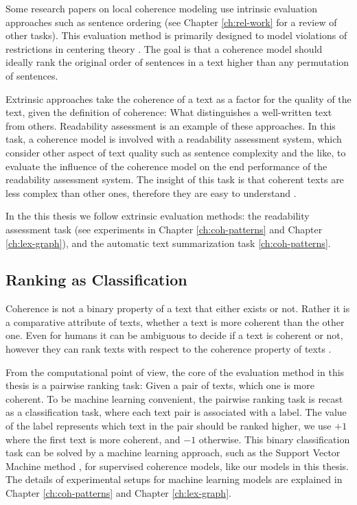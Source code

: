 Some research papers on local coherence modeling use intrinsic evaluation approaches such as sentence ordering \cite{karamanis04a,barzilay04} (see Chapter \ref{ch:rel-work} for a review of other tasks).  
This evaluation method is primarily designed to model violations of restrictions in centering theory . 
The goal is that a coherence model should ideally rank the original order of sentences in a text higher than any permutation of sentences. 

Extrinsic approaches take the coherence of a text as a factor for the quality of the text, given the definition of coherence: What distinguishes a well-written text from others. 
Readability assessment \cite{pitler08} is an example of these approaches. 
In this task, a coherence model is involved with a readability assessment system, which consider other aspect of text quality such as sentence complexity and the like, to evaluate the influence of the coherence model on the end performance of the readability assessment system. 
The insight of this task is that coherent texts are less complex than other ones, therefore they are easy to understand \cite{pitler08}. 

In the this thesis we follow extrinsic evaluation methods: the readability assessment task (see experiments in Chapter \ref{ch:coh-patterns} and Chapter \ref{ch:lex-graph}), and the automatic text summarization task \ref{ch:coh-patterns}. 

\subsection{Ranking as Classification} 

Coherence is not a binary property of a text that either exists or not. 
Rather it is a comparative attribute of texts, whether a text is more coherent than the other one. 
Even for humans it can be ambiguous to decide if a text is coherent or not, however they can rank texts with respect to the coherence property of texts \cite{halliday76}.   

From the computational point of view, the core of the evaluation method in this thesis is a pairwise ranking task: Given a pair of texts, which one is more coherent. 
To be machine learning convenient, the pairwise ranking task is recast as a classification task, where each text pair is associated with a label. 
The value of the label represents which text in the pair should be ranked higher, we use $+1$ where the first text is more coherent, and $-1$ otherwise. 
This binary classification task can be solved by a machine learning approach, such as the Support Vector Machine method \cite{}, for supervised coherence models, like our models in this thesis. 
The details of experimental setups for machine learning models are explained in Chapter \ref{ch:coh-patterns} and Chapter \ref{ch:lex-graph}.  

